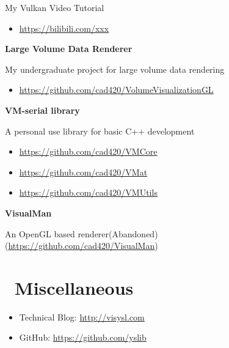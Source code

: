 \documentclass{resume}
\begin{document}
   My Vulkan Video Tutorial
\begin{itemize}
  \item \url{https://bilibili.com/xxx}
\end{itemize}

\textbf{Large Volume Data Renderer}

  My undergraduate project for large volume data rendering 

\begin{itemize}
  \item \url{https://github.com/cad420/VolumeVisualizationGL}
\end{itemize}

\textbf{VM-serial library}

 A personal use library for basic C++ development


\begin{itemize}
  \item \url{https://github.com/cad420/VMCore}
  \item \url{https://github.com/cad420/VMat}
  \item \url{https://github.com/cad420/VMUtils}
\end{itemize}

\textbf{VisualMan}

  An OpenGL based renderer(Abandoned) (\url{https://github.com/cad420/VisualMan})

\section{\faInfo\ Miscellaneous}
\begin{itemize}[parsep=0.5ex]
  \item Technical Blog: \url{http://visysl.com}
  \item GitHub: \url{https://github.com/yslib}
\end{itemize}
\end{document}
